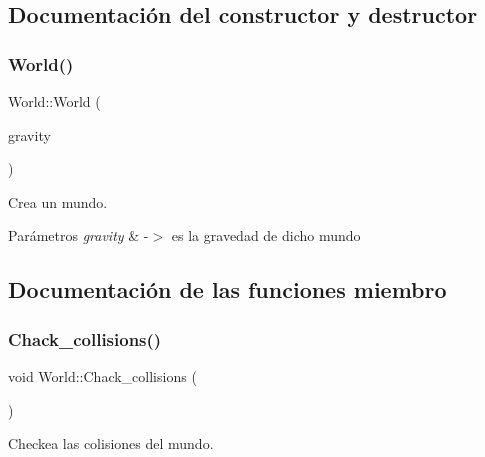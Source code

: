 \subsection{Documentación del constructor y destructor}
\mbox{\label{classbullet_1_1_world_a1f66a0de2a5e68b6ab60798f6079a717}} 
\subsubsection{\texorpdfstring{World()}{World()}}
{\footnotesize\ttfamily World\+::\+World (\begin{DoxyParamCaption}\item[{bt\+Vector3}]{gravity }\end{DoxyParamCaption})}



Crea un mundo. 


\begin{DoxyParams}{Parámetros}
{\em gravity} & -\/$>$ es la gravedad de dicho mundo \\
\hline
\end{DoxyParams}


\subsection{Documentación de las funciones miembro}
\mbox{\label{classbullet_1_1_world_af2b049dee491b5f571adf4d636602e8b}} 
\subsubsection{\texorpdfstring{Chack\_collisions()}{Chack\_collisions()}}
{\footnotesize\ttfamily void World\+::\+Chack\+\_\+collisions (\begin{DoxyParamCaption}{ }\end{DoxyParamCaption})}



Checkea las colisiones del mundo. 

\mbox{\label{classbullet_1_1_world_a9ea86b3faa211bac0cc1f8beec534672}} 
